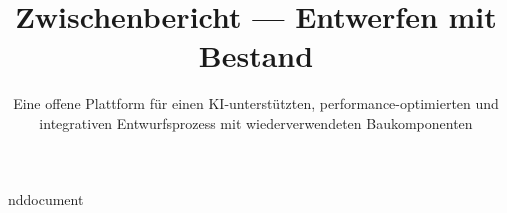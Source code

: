 \documentclass[type=zwischenbericht]{zukunftbau}
\title{Zwischenbericht --- Entwerfen mit Bestand}
\subtitle{Eine offene Plattform für einen KI-unterstützten, performance-optimierten und integrativen Entwurfsprozess mit wiederverwendeten Baukomponenten}
\begin{document}
\makecoverpages

\maketableofcontents
nd{document}
\end{document}
